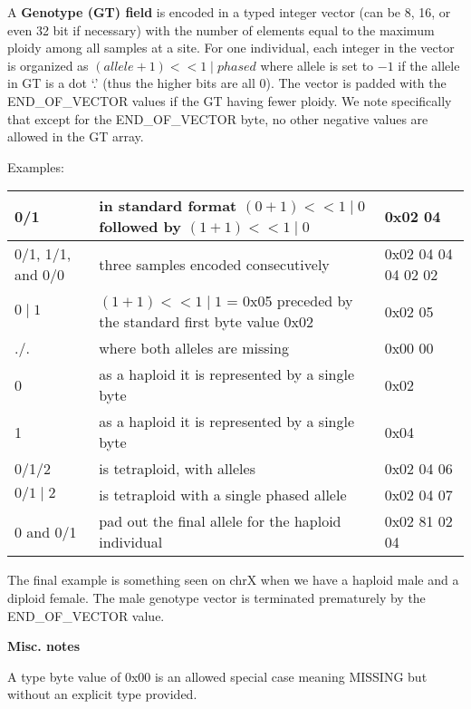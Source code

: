 \documentclass[8pt]{article}
\begin{document}
\vspace{0.3cm}
A \textbf{Genotype (GT) field} is encoded in a typed integer vector (can be 8, 16, or even 32 bit if necessary) with the number of elements equal to the maximum ploidy among all samples at a site.
For one individual, each integer in the vector is organized as $(allele+1) << 1 \mid phased$ where allele is set to $-1$ if the allele in GT is a dot `.' (thus the higher bits are all 0).
The vector is padded with the END\_OF\_VECTOR values if the GT having fewer ploidy.
We note specifically that except for the END\_OF\_VECTOR byte, no other negative values are allowed in the GT array.

Examples:

\vspace{0.3cm}
\small
\begin{tabular}{|p{2.5cm} | p{10cm} | p{3cm}|} \hline
0/1 & in standard format $(0 + 1) << 1 \mid 0$ followed by $(1 + 1) << 1 \mid 0$ & 0x02 04 \\ \hline
0/1, 1/1, and 0/0 & three samples encoded consecutively & 0x02 04 04 04 02 02 \\ \hline
$0\mid1$ & $(1 + 1) << 1 \mid 1$ = 0x05 preceded by the standard first byte value 0x02 & 0x02 05 \\ \hline
./. & where both alleles are missing & 0x00 00 \\ \hline
0 & as a haploid it is represented by a single byte & 0x02 \\ \hline
1 & as a haploid it is represented by a single byte & 0x04 \\ \hline
0/1/2 & is tetraploid, with alleles & 0x02 04 06 \\ \hline
$0/1\mid2$ & is tetraploid with a single phased allele & 0x02 04 07 \\ \hline
0 and 0/1 & pad out the final allele for the haploid individual & 0x02 81 02 04\\ \hline
\end{tabular}
\normalsize

\vspace{0.3cm}
The final example is something seen on chrX when we have a haploid male and a diploid female.
The male genotype vector is terminated prematurely by the END\_OF\_VECTOR value.
\vspace{0.3cm}

\textbf{Misc. notes}

A type byte value of 0x00 is an allowed special case meaning MISSING but without an explicit type provided.
\end{document}
